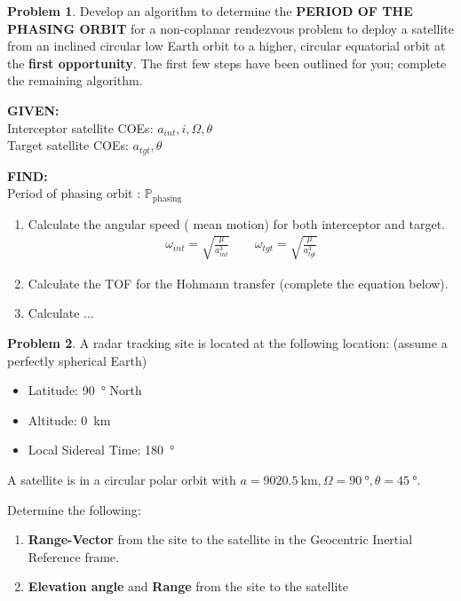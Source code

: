 \documentclass[10pt]{article}
\theoremstyle{definition}
\newtheorem{prob}{Problem}[section]
\newenvironment{subprob}%
{\renewcommand{\theenumi}{\alph{enumi}}\renewcommand{\labelenumi}{(\theenumi)}\begin{enumerate}}%
{\end{enumerate}}%
\begin{document}
\clearpage\newpage
\null\newpage
\null\newpage

\begin{prob}
    Develop an algorithm to determine the \textbf{PERIOD OF THE PHASING ORBIT} for a non-coplanar rendezvous problem to deploy a satellite from an inclined circular low Earth orbit to a higher, circular equatorial orbit at the \textbf{first opportunity}.
    The first  few steps have been outlined for you; complete the remaining algorithm.

\noindent\textbf{GIVEN:} \\
        Interceptor satellite COEs: \( a_{int}, i, \Omega, \theta\)\\
        Target satellite COEs: \( a_{tgt}, \theta\)

\noindent\textbf{FIND:} \\
Period of phasing orbit : \( \mathbb{P}_{\text{phasing}}\)

\begin{enumerate}
\item Calculate the angular speed ( mean motion) for both interceptor and target.
    \begin{align*}
        \omega_{int} = \sqrt{\frac{\mu}{a_{int}^3}} \qquad \omega_{tgt} = \sqrt{\frac{\mu}{a_{tgt}^3}}
    \end{align*}

\item Calculate the TOF for the Hohmann transfer (complete the equation below).
    \vspace*{2cm}
\item Calculate ...
\end{enumerate}
\end{prob}
\clearpage\newpage
\null\newpage
\null\newpage

\begin{prob}
    A radar tracking site is located at the following location: (assume a perfectly spherical Earth)
    \begin{itemize}
        \item Latitude: \SI{90}{\degree} North
        \item Altitude: \SI{0}{\kilo\meter}
        \item Local Sidereal Time: \SI{180}{\degree}
    \end{itemize}

    A satellite is in a circular polar orbit with \( a = \SI{9020.5}{\kilo\meter}, \Omega = \SI{90}{\degree}, \theta = \SI{45}{\degree}\).

    Determine the following:
    \begin{subprob}
    \item \textbf{Range-Vector} from the site to the satellite in the Geocentric Inertial Reference frame.
    \item \textbf{Elevation angle} and \textbf{Range} from the site to the satellite
    \end{subprob}
\end{prob}
\end{document}
